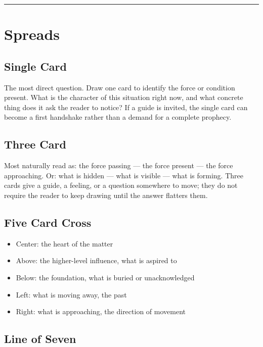 \begin{center}\rule{0.5\linewidth}{0.5pt}\end{center}

\section{Spreads}\label{spreads}

\subsection{Single Card}\label{single-card}

The most direct question. Draw one card to identify the force or condition
present. What is the character of this situation right now, and what concrete
thing does it ask the reader to notice? If a guide is invited, the single card
can become a first handshake rather than a demand for a complete prophecy.

\subsection{Three Card}\label{three-card}

Most naturally read as: the force passing --- the force present --- the force
approaching. Or: what is hidden --- what is visible --- what is forming. Three
cards give a guide, a feeling, or a question somewhere to move; they do not
require the reader to keep drawing until the answer flatters them.

\subsection{Five Card Cross}\label{five-card-cross}

\begin{itemize}
\tightlist
\item
  Center: the heart of the matter
\item
  Above: the higher-level influence, what is aspired to
\item
  Below: the foundation, what is buried or unacknowledged
\item
  Left: what is moving away, the past
\item
  Right: what is approaching, the direction of movement
\end{itemize}

\subsection{Line of Seven}\label{line-of-seven}

